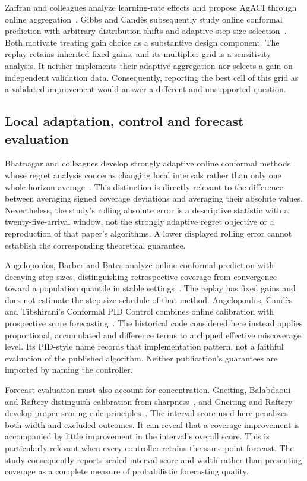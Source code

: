 Zaffran and colleagues analyze learning-rate effects and propose AgACI through online aggregation~\cite{agaci2022}. Gibbs and Cand\`es subsequently study online conformal prediction with arbitrary distribution shifts and adaptive step-size selection~\cite{gibbs2024}. Both motivate treating gain choice as a substantive design component. The replay retains inherited fixed gains, and its multiplier grid is a sensitivity analysis. It neither implements their adaptive aggregation nor selects a gain on independent validation data. Consequently, reporting the best cell of this grid as a validated improvement would answer a different and unsupported question.

\subsection{Local adaptation, control and forecast evaluation}
Bhatnagar and colleagues develop strongly adaptive online conformal methods whose regret analysis concerns changing local intervals rather than only one whole-horizon average~\cite{strong2023}. This distinction is directly relevant to the difference between averaging signed coverage deviations and averaging their absolute values. Nevertheless, the study's rolling absolute error is a descriptive statistic with a twenty-five-arrival window, not the strongly adaptive regret objective or a reproduction of that paper's algorithms. A lower displayed rolling error cannot establish the corresponding theoretical guarantee.

Angelopoulos, Barber and Bates analyze online conformal prediction with decaying step sizes, distinguishing retrospective coverage from convergence toward a population quantile in stable settings~\cite{decay2024}. The replay has fixed gains and does not estimate the step-size schedule of that method. Angelopoulos, Cand\`es and Tibshirani's Conformal PID Control combines online calibration with prospective score forecasting~\cite{angelopoulos2023}. The historical code considered here instead applies proportional, accumulated and difference terms to a clipped effective miscoverage level. Its PID-style name records that implementation pattern, not a faithful evaluation of the published algorithm. Neither publication's guarantees are imported by naming the controller.

Forecast evaluation must also account for concentration. Gneiting, Balabdaoui and Raftery distinguish calibration from sharpness~\cite{sharpness2007}, and Gneiting and Raftery develop proper scoring-rule principles~\cite{gneiting2007}. The interval score used here penalizes both width and excluded outcomes. It can reveal that a coverage improvement is accompanied by little improvement in the interval's overall score. This is particularly relevant when every controller retains the same point forecast. The study consequently reports scaled interval score and width rather than presenting coverage as a complete measure of probabilistic forecasting quality.

